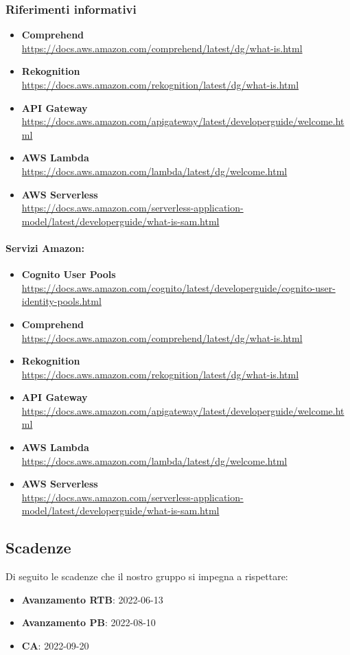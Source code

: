 \subsubsection{Riferimenti informativi}
\begin{itemize}
	\item 
	{\textbf{Comprehend}}\\\url{https://docs.aws.amazon.com/comprehend/latest/dg/what-is.html}
	\item
	{\textbf{Rekognition}}\\\url{https://docs.aws.amazon.com/rekognition/latest/dg/what-is.html}
	\item
	{\textbf{API Gateway}}\\\url{https://docs.aws.amazon.com/apigateway/latest/developerguide/welcome.html}
	\item
	{\textbf{AWS Lambda}}\\\url{https://docs.aws.amazon.com/lambda/latest/dg/welcome.html}
	\item
	{\textbf{AWS Serverless}}\\\url{https://docs.aws.amazon.com/serverless-application-model/latest/developerguide/what-is-sam.html}
\end{itemize}
	\paragraph{Servizi Amazon:} 
\begin{itemize}
	\item
	{\textbf{Cognito User Pools}}\\\url{https://docs.aws.amazon.com/cognito/latest/developerguide/cognito-user-identity-pools.html}
	\item
	{\textbf{Comprehend}}\\\url{https://docs.aws.amazon.com/comprehend/latest/dg/what-is.html}
	\item 
	{\textbf{Rekognition}}\\\url{https://docs.aws.amazon.com/rekognition/latest/dg/what-is.html}
	\item 
	{\textbf{API Gateway}}\\\url{https://docs.aws.amazon.com/apigateway/latest/developerguide/welcome.html}
	\item
	{\textbf{AWS Lambda}}\\\url{https://docs.aws.amazon.com/lambda/latest/dg/welcome.html}
	\item 
	{\textbf{AWS Serverless}}\\\url{https://docs.aws.amazon.com/serverless-application-model/latest/developerguide/what-is-sam.html}
\end{itemize}

\subsection{Scadenze}
Di seguito le scadenze che il nostro gruppo si impegna a rispettare:
\begin{itemize}
	\item \textbf{Avanzamento RTB}: 2022-06-13
	\item \textbf{Avanzamento PB}: 2022-08-10
	\item \textbf{CA}: 2022-09-20
\end{itemize}
